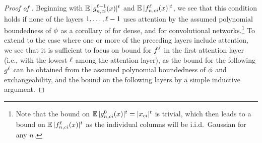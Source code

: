 \begin{proof}[Proof of ]
    Beginning with
    $
        \operatorname*{\mathbb{E}} | 
            {g}^{\ell - 1}_{n, c i}{(x)} 
        |^t
    $
    and
    $
        \operatorname*{\mathbb{E}} | 
            {f}^{\ell}_{n, c i}{(x)} 
        |^t
    $,
    we see that this condition holds if none of the layers $1, \ldots, \ell - 1$ uses attention by the assumed polynomial boundedness of $\phi$ as a corollary of \citep[lemma 20]{matthews2018gaussian} for dense, and \citep[pages 14 and 15]{garriga2019deep} for convolutional networks.\footnote{Note that the bound on $\operatorname*{\mathbb{E}} | {g}^{0}_{n, c i}{(x)} |^t = |x_{c i}|^t$ is trivial, which then leads to a bound on $\operatorname*{\mathbb{E}} |{f}^{\ell}_{n, c i}{(x)} |^t$ as the individual columns will be i.i.d.\ Gaussian for any $n$.}
    To extend to the case where one or more of the preceding layers include attention, we see that it is sufficient to focus on bound for $f^{\ell}$ in the first attention layer (i.e., with the lowest $\ell$ among the attention layer), as the bound for the following $g^{\ell}$ can be obtained from the assumed polynomial boundedness of $\phi$ and exchangeability, and the bound on the following layers by a simple inductive argument.
    

\end{proof}
